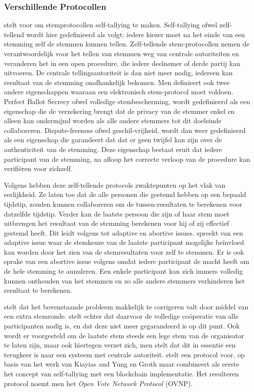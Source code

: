 		\subsubsection{Verschillende Protocollen}
		\textcite{Kiayias2002} stelt voor om stemprotocollen self-tallying te maken. Self-tallying ofwel zelf-tellend wordt hier gedefinieerd als volgt: iedere kiezer moet na het einde van een stemming zelf de stemmen kunnen tellen. Zelf-tellende stem-protocollen nemen de verantwoordelijk voor het tellen van stemmen weg van centrale autoriteiten en veranderen het in een open procedure, die iedere deelnemer of derde partij kan uitvoeren. De centrale tellingsautoriteit is dan niet meer nodig, iedereen kan resultaat van de stemming onafhankelijk bekomen. Men definieert ook twee andere eigenschappen waaraan een elektronisch stem-protocol moet voldoen.  Perfect Ballot Secrecy ofwel volledige stembescherming, wordt gedefinieerd als een eigenschap die de verzekering brengt dat de privacy van de stemmer enkel en alleen kan ondermijnd worden als alle andere stemmers tot dit doeleinde collaboreren. Dispute-freeness ofwel geschil-vrijheid, wordt dan weer gedefinieerd als een eigenschap die garandeert dat dat er geen twijfel kan zijn over de authenticiteit van de stemming. Deze eigenschap bestaat eruit dat iedere participant van de stemming, na afloop het correcte verloop van de procedure kan verifiëren voor zichzelf.
			
		Volgens \textcite{McCorry2017}  hebben deze zelf-tellende protocols zwaktepunten op het vlak van eerlijkheid. Ze laten toe dat de alle personen die gestemd hebben op een bepaald tijdstip, zouden kunnen collaboreren om de tussen-resultaten te berekenen voor datzelfde tijdstip. Verder kan de laatste persoon die zijn of haar stem moet uitbrengen het resultaat van de stemming berekenen voor hij of zij effectief gestemd heeft. Dit leidt volgens \textcite{McCorry2017} tot adaptive en abortive issues.  \textcite{McCorry2017} spreekt van een adaptive issue waar de stemkeuze van de laatste participant mogelijks beïnvloed kan worden door het zien van de stemresultaten voor zelf te stemmen. Er is ook sprake van een abortive issue volgens \textcite{McCorry2017} omdat iedere participant de macht heeft om de hele stemming te annuleren. Een enkele participant kan zich immers volledig kunnen onthouden van het stemmen en zo alle andere stemmers verhinderen het resultaat te berekenen. 
			
		\textcite{Kiayias2002} stelt dat het bovenstaande probleem makkelijk te corrigeren valt door middel van een extra stemronde. \textcite{McCorry2017} stelt echter dat daarvoor de volledige coöperatie van alle participanten nodig is, en dat deze niet meer gegarandeerd is op dit punt. Ook wordt er voorgesteld om de laatste stem steeds een lege stem van de organisator te laten zijn, maar ook hiertegen verzet \textcite{McCorry2017} zich, men stelt dat dit in essentie een terugkeer is naar een systeem met centrale autoriteit.  \textcite{McCorry2017} stelt een protocol voor, op basis van het werk van Kiayias and Yung en Groth maar combineert als eerste het concept van self-tallying met een blockchain implementatie. Het resulteren protocol noemt men het \textit{Open Vote Network Protocol} (OVNP).
		
